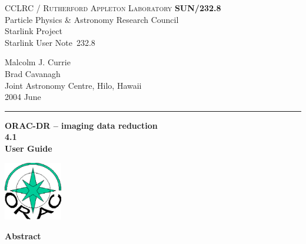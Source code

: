 \documentclass[twoside,11pt]{article}
\newcommand{\stardoccategory}  {Starlink User Note}
\newcommand{\stardocinitials}  {SUN}
\newcommand{\stardocnumber}    {232.8}
\newcommand{\stardocauthors}   {Malcolm J. Currie\\
                               Brad Cavanagh\\
                               Joint Astronomy Centre, Hilo, Hawaii}
\newcommand{\stardocdate}      {2004 June}
\newcommand{\stardoctitle}     {ORAC-DR -- imaging data reduction}
\newcommand{\stardocversion}   {4.1}
\newcommand{\stardocmanual}    {User Guide}
\newcommand{\stardocname}{\stardocinitials /\stardocnumber}
\newenvironment{latexonly}{}{}
\renewcommand{\_}{\texttt{\symbol{95}}}
\begin{document}
\thispagestyle{empty}

\begin{latexonly}
   CCLRC / \textsc{Rutherford Appleton Laboratory} \hfill \textbf{\stardocname}\\
   {\large Particle Physics \& Astronomy Research Council}\\
   {\large Starlink Project\\}
   {\large \stardoccategory\ \stardocnumber}
   \begin{flushright}
   \stardocauthors\\
   \stardocdate
   \end{flushright}
   \vspace{-4mm}
   \rule{\textwidth}{0.5mm}
   \vspace{5mm}
   \begin{center}
   {\Huge\textbf{\stardoctitle \\ [2.5ex]}}
   {\LARGE\textbf{\stardocversion \\ [4ex]}}
   {\Huge\textbf{\stardocmanual}}
   \end{center}
   \vspace{5mm}

\begin{center}
\includegraphics[width=1.0in]{sun232_logo.eps}
\end{center}

   \vspace{10mm}
   \begin{center}
      {\Large\textbf{Abstract}}
   \end{center}
\end{latexonly}
\end{document}
